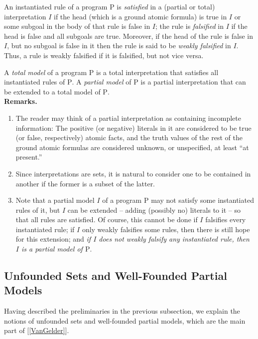 An instantiated rule of a program $\mathrm{P}$ is \emph{satisfied} in a (partial or total) interpretation $I$ if the head (which is a ground atomic formula) is true in $I$ or some subgoal in the body of that rule is false in $I$; the rule is \emph{falsified} in $I$ if the head is false and all subgoals are true. Moreover, if the head of the rule is false in $I$, but no subgoal is false in it then the rule is said to be \emph{weakly falsified} in $I$. Thus, a rule is weakly falsified if it is falsified, but not vice versa.

A \emph{total model} of a program $\mathrm{P}$ is a total interpretation that satisfies all instantiated rules of $\mathrm{P}$. A \emph{partial model} of $\mathrm{P}$ is a partial interpretation that can be extended to a total model of $\mathrm{P}$.
\ \medskip\\
\noindent\textbf{Remarks.}
\begin{enumerate}[label=(\alph*)]
%
\item The reader may think of a partial interpretation as containing incomplete information: The positive (or negative) literals in it are considered to be true (or false, respectively) atomic facts, and the truth values of the rest of the ground atomic formulas are considered unknown, or unspecified, at least ``at present.''
%
\item Since interpretations are sets, it is natural to consider one to be contained in another if the former is a subset of the latter.
%
\item Note that a partial model $I$ of a program $\mathrm{P}$ may not satisfy some instantiated rules of it, but $I$ can be extended -- adding (possibly no) literals to it -- so that all rules are satisfied. Of course, this cannot be done if $I$ falsifies every instantiated rule; if $I$ only weakly falsifies some rules, then there is still hope for this extension; and \emph{if $I$ does not weakly falsify any instantiated rule, then $I$ is a partial model of $\mathrm{P}$}.
%
\end{enumerate}

\subsection{Unfounded Sets and Well-Founded Partial Models}
Having described the preliminaries in the previous subsection, we explain the notions of unfounded sets and well-founded partial models, which are the main part of [\ref{VanGelder}].

